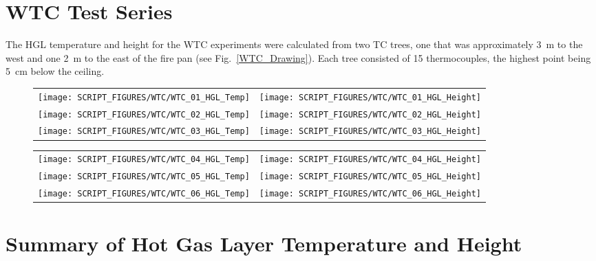 \clearpage



\section{WTC Test Series}

The HGL temperature and height for the WTC experiments were calculated from two TC trees, one that was approximately 3~m to the west and one
2~m to the east of the fire pan (see Fig.~\ref{WTC_Drawing}). Each tree consisted of 15 thermocouples, the highest point being 5~cm below the ceiling.

\begin{figure}[h!]
\begin{tabular*}{\textwidth}{l@{\extracolsep{\fill}}r}
\texttt{[image: SCRIPT\_FIGURES/WTC/WTC\_01\_HGL\_Temp]} &
\texttt{[image: SCRIPT\_FIGURES/WTC/WTC\_01\_HGL\_Height]} \\
\texttt{[image: SCRIPT\_FIGURES/WTC/WTC\_02\_HGL\_Temp]} &
\texttt{[image: SCRIPT\_FIGURES/WTC/WTC\_02\_HGL\_Height]} \\
\texttt{[image: SCRIPT\_FIGURES/WTC/WTC\_03\_HGL\_Temp]} &
\texttt{[image: SCRIPT\_FIGURES/WTC/WTC\_03\_HGL\_Height]}
\end{tabular*}
\end{figure}

\newpage

\begin{figure}[p]
\begin{tabular*}{\textwidth}{l@{\extracolsep{\fill}}r}
\texttt{[image: SCRIPT\_FIGURES/WTC/WTC\_04\_HGL\_Temp]} &
\texttt{[image: SCRIPT\_FIGURES/WTC/WTC\_04\_HGL\_Height]} \\
\texttt{[image: SCRIPT\_FIGURES/WTC/WTC\_05\_HGL\_Temp]} &
\texttt{[image: SCRIPT\_FIGURES/WTC/WTC\_05\_HGL\_Height]} \\
\texttt{[image: SCRIPT\_FIGURES/WTC/WTC\_06\_HGL\_Temp]} &
\texttt{[image: SCRIPT\_FIGURES/WTC/WTC\_06\_HGL\_Height]}
\end{tabular*}
\end{figure}

\clearpage


\section{Summary of Hot Gas Layer Temperature and Height}


